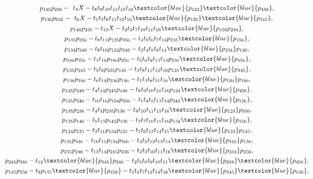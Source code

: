 \documentclass[10pt,a4paper]{amsart}
\numberwithin{equation}{section}
\begin{document}
\begin{gather*}
\\[.2ex]
p_{145}p_{236}-{}_{\phantom{1}}t_{4}X-t_{8}t_{9}t_{10}t_{11}t_{15}t_{16}\textcolor{blue}{p_{123}}\textcolor{blue}{p_{456}},\\[.2ex]
p_{136}p_{245}-{}_{\phantom{1}} t_{6}X - t_{1}t_{3}t_{8}t_{11}t_{12}t_{16}\textcolor{blue}{p_{126}}\textcolor{blue}{p_{345}},\\[.2ex]
p_{146}p_{235} - t_{13}X - t_{2}t_{3}t_{7}t_{10}t_{11}t_{16}\textcolor{blue}{p_{156}p_{234}},
\\[.2ex]
p_{135}p_{256}-t_{8}t_{11}p_{125}p_{356}-t_{4}t_{5}t_{6}t_{7}t_{14}p_{235}\textcolor{blue}{p_{156}},\\[.2ex]
p_{134}p_{246}-t_{8}t_{16}p_{124}p_{346}-t_{2}t_{4}t_{5}t_{6}t_{14}\textcolor{blue}{p_{234}}p_{146},\\[.2ex]
p_{246}p_{356}-t_{3}t_{16}p_{346}p_{256}-t_{5}t_{6}t_{9}t_{13}t_{14}p_{236}\textcolor{blue}{p_{456}},\\[.2ex]
p_{135}p_{245}-t_{5}t_{6}p_{235}p_{145}-t_{3}t_{8}t_{11}t_{12}t_{16}p_{125}\textcolor{blue}{p_{345}},\\[.2ex]
p_{136}p_{246}-t_{6}t_{14}p_{236}p_{146}-t_{1}t_{3}t_{8}t_{11}t_{16}\textcolor{blue}{p_{126}}p_{346},\\[.2ex]
p_{145}p_{246}-t_{4}t_{14}p_{245}p_{146}-t_{8}t_{9}t_{10}t_{11}t_{16}p_{124}\textcolor{blue}{p_{456}},\\[.2ex]
p_{125}p_{246}-t_{10}t_{16}p_{124}p_{256}-t_{1}t_{4}t_{5}t_{13}t_{14}p_{245}\textcolor{blue}{p_{126}},\\[.2ex]
p_{135}p_{236}-t_{4}t_{5}p_{235}p_{136}-t_{8}t_{10}t_{11}t_{15}t_{16}\textcolor{blue}{p_{123}}p_{356},\\[.2ex]
p_{135}p_{146}-t_{5}t_{13}p_{145}p_{136}-t_{3}t_{7}t_{10}t_{11}t_{16}p_{134}\textcolor{blue}{p_{156}},\\[.2ex]
p_{124}p_{135}-t_{3}t_{11}p_{134}p_{125}-t_{5}t_{6}t_{13}t_{14}t_{15}\textcolor{blue}{p_{123}}p_{145},\\[.2ex]
p_{135}p_{346}-t_{10}t_{11}p_{134}p_{356}-t_{4}t_{5}t_{12}t_{13}t_{14}\textcolor{blue}{p_{345}}p_{136},\\[.2ex]
p_{235}p_{246}-t_{13}t_{14}p_{245}p_{236}-t_{2}t_{3}t_{10}t_{11}t_{16}\textcolor{blue}{p_{234}}p_{256},\\[.2ex]
%
p_{245}p_{346}-t_{12}\textcolor{blue}{p_{345}}p_{246}-t_{2}t_{5}t_{6}t_{9}t_{10}t_{11}\textcolor{blue}{p_{234}}\textcolor{blue}{p_{456}},\\[.2ex]
p_{145}p_{356}-t_{9}p_{135}\textcolor{blue}{p_{456}}-t_{3}t_{4}t_{7}t_{12}t_{14}t_{16}\textcolor{blue}{p_{345}}\textcolor{blue}{p_{156}},\\[.2ex]

\end{gather*}
\end{document}
